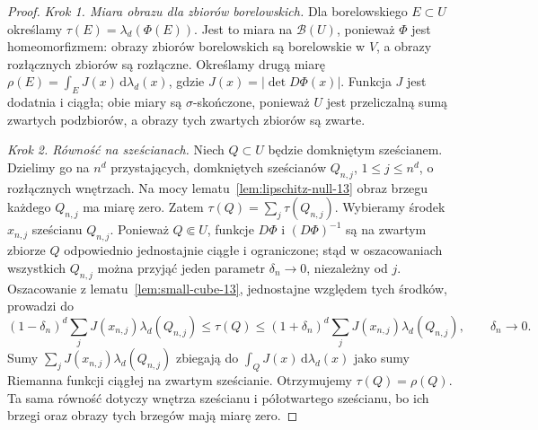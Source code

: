 \begin{proof}
\emph{Krok 1. Miara obrazu dla zbiorów borelowskich.}
Dla borelowskiego $E\subset U$ określamy
$\tau(E)=\lambda_d(\Phi(E))$. Jest to miara na
$\mathcal B(U)$, ponieważ $\Phi$ jest homeomorfizmem:
obrazy zbiorów borelowskich są borelowskie w $V$, a obrazy
rozłącznych zbiorów są rozłączne. Określamy drugą miarę
$\rho(E)=\int_E J(x)\,\mathrm d\lambda_d(x)$,
gdzie $J(x)=|\det D\Phi(x)|$. Funkcja $J$ jest dodatnia
i ciągła; obie miary są $\sigma$-skończone, ponieważ
$U$ jest przeliczalną sumą zwartych podzbiorów,
a obrazy tych zwartych zbiorów są zwarte.

\emph{Krok 2. Równość na sześcianach.}
Niech $Q\subset U$ będzie domkniętym sześcianem.
Dzielimy go na $n^d$ przystających, domkniętych
sześcianów $Q_{n,j}$, $1\le j\le n^d$, o rozłącznych wnętrzach.
Na mocy lematu~\ref{lem:lipschitz-null-13} obraz brzegu
każdego $Q_{n,j}$ ma miarę zero. Zatem
$\tau(Q)=\sum_j\tau(Q_{n,j})$.
Wybieramy środek $x_{n,j}$ sześcianu $Q_{n,j}$.
Ponieważ $Q\Subset U$, funkcje $D\Phi$ i
$(D\Phi)^{-1}$ są na zwartym zbiorze $Q$ odpowiednio
jednostajnie ciągłe i ograniczone; stąd w oszacowaniach
wszystkich $Q_{n,j}$ można przyjąć jeden parametr
$\delta_n\to0$, niezależny od $j$.
Oszacowanie z lematu~\ref{lem:small-cube-13},
jednostajne względem tych środków, prowadzi do
\[
(1-\delta_n)^d\sum_jJ(x_{n,j})\lambda_d(Q_{n,j})
\le\tau(Q)\le
(1+\delta_n)^d\sum_jJ(x_{n,j})\lambda_d(Q_{n,j}),
\qquad\delta_n\to0.
\]
Sumy $\sum_jJ(x_{n,j})\lambda_d(Q_{n,j})$ zbiegają
do $\int_QJ(x)\,\mathrm d\lambda_d(x)$ jako sumy Riemanna
funkcji ciągłej na zwartym sześcianie. Otrzymujemy
$\tau(Q)=\rho(Q)$. Ta sama równość dotyczy wnętrza
sześcianu i półotwartego sześcianu, bo ich brzegi
oraz obrazy tych brzegów mają miarę zero.


\end{proof}
